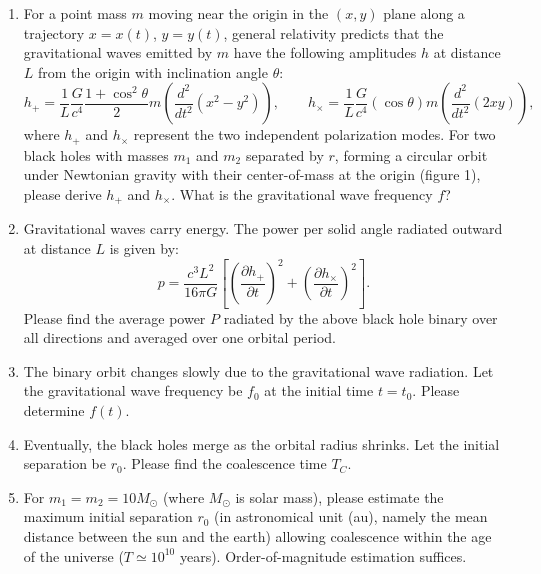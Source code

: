 \begin{exercise}
\begin{enumerate}
    \item For a point mass $m$ moving near the origin in the $(x, y)$ plane along a trajectory $x = x(t)$, $y = y(t)$, general relativity predicts that the gravitational waves emitted by $m$ have the following amplitudes $h$ at distance $L$ from the origin with inclination angle $\theta$:
    \begin{equation}
        h_+ = \frac{1}{L} \frac{G}{c^4} \frac{1 + \cos^2 \theta}{2} m \left(\frac{d^2}{dt^2} (x^2 - y^2)\right), \qquad h_\times = \frac{1}{L} \frac{G}{c^4} (\cos \theta) m \left(\frac{d^2}{dt^2} (2xy)\right), \tag{7}
    \end{equation}
    where $h_+$ and $h_\times$ represent the two independent polarization modes. For two black holes with masses $m_1$ and $m_2$ separated by $r$, forming a circular orbit under Newtonian gravity with their center-of-mass at the origin (figure 1), please derive $h_+$ and $h_\times$. What is the gravitational wave frequency $f$?
    \item Gravitational waves carry energy. The power per solid angle radiated outward at distance $L$ is given by:
    \begin{equation}
        p = \frac{c^3 L^2}{16 \pi G} \left[ \left(\frac{\partial h_+}{\partial t}\right)^2 + \left(\frac{\partial h_\times}{\partial t}\right)^2 \right]. \tag{8}
    \end{equation}
    Please find the average power $P$ radiated by the above black hole binary over all directions and averaged over one orbital period.
    \item The binary orbit changes slowly due to the gravitational wave radiation. Let the gravitational wave frequency be $f_0$ at the initial time $t = t_0$. Please determine $f(t)$.
    \item Eventually, the black holes merge as the orbital radius shrinks. Let the initial separation be $r_0$. Please find the coalescence time $T_C$.
    \item For $m_1 = m_2 = 10 M_\odot$ (where $M_\odot$ is solar mass), please estimate the maximum initial separation $r_0$ (in astronomical unit (au), namely the mean distance between the sun and the earth) allowing coalescence within the age of the universe ($T \simeq 10^{10}$ years). Order-of-magnitude estimation suffices.
\end{enumerate}
\end{exercise}

